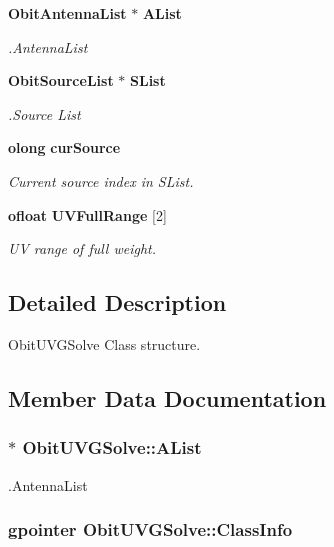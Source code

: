 \begin{CompactItemize}
{\bf Obit\-Antenna\-List} $\ast$ {\bf AList}
\begin{CompactList}\small\item\em .Antenna\-List \item\end{CompactList}\item 
{\bf Obit\-Source\-List} $\ast$ {\bf SList}
\begin{CompactList}\small\item\em .Source List \item\end{CompactList}\item 
{\bf olong} {\bf cur\-Source}
\begin{CompactList}\small\item\em Current source index in SList. \item\end{CompactList}\item 
{\bf ofloat} {\bf UVFull\-Range} [2]
\begin{CompactList}\small\item\em UV range of full weight. \item\end{CompactList}\end{CompactItemize}


\subsection{Detailed Description}
Obit\-UVGSolve Class structure. 



\subsection{Member Data Documentation}
\subsubsection{$\ast$ {\bf Obit\-UVGSolve::AList}}\label{structObitUVGSolve_o6}


.Antenna\-List 

\subsubsection{\setlength{\rightskip}{0pt plus 5cm}gpointer {\bf Obit\-UVGSolve::Class\-Info}}\label{structObitUVGSolve_o1}


